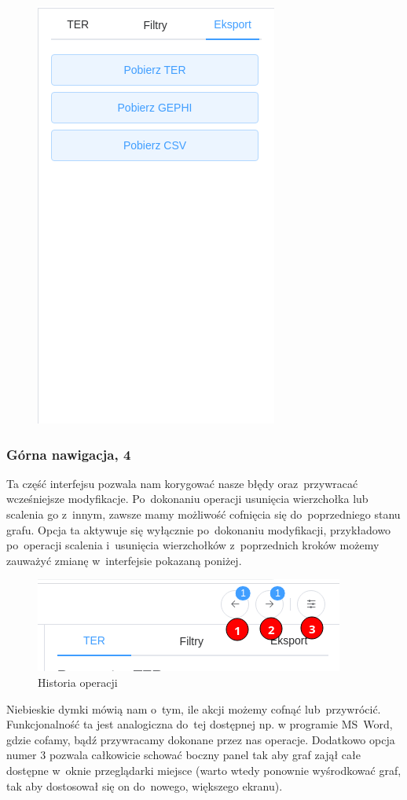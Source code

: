 \documentclass[12pt, a4paper]{article}
\begin{document}
\begin{figure}[H]
  \centering
  \includegraphics[width=0.4\linewidth, trim={0 8cm 0 0},clip]{images/graph-export.png}
\end{figure}

\subsubsection{Górna nawigacja, 4}

Ta część interfejsu pozwala nam korygować nasze błędy oraz~przywracać wcześniejsze modyfikacje. Po~dokonaniu operacji usunięcia wierzchołka lub scalenia go z~innym, zawsze mamy możliwość cofnięcia się do~poprzedniego stanu grafu. Opcja ta aktywuje się wyłącznie po~dokonaniu modyfikacji, przykładowo po~operacji scalenia i~usunięcia wierzchołków z~poprzednich kroków możemy zauważyć zmianę w~interfejsie pokazaną poniżej.

\begin{figure}[H]
  \centering
  \includegraphics[width=0.6\linewidth]{images/graph-top-navigation.png}
  \caption{Historia operacji}
\end{figure}

\noindent Niebieskie dymki mówią nam o~tym, ile akcji możemy cofnąć lub~przywrócić. Funkcjonalność ta jest analogiczna do~tej dostępnej np. w programie MS~Word, gdzie cofamy, bądź przywracamy dokonane przez nas operacje. Dodatkowo opcja numer $3$ pozwala całkowicie schować boczny panel tak aby graf zajął całe dostępne w~oknie przeglądarki miejsce (warto wtedy ponownie wyśrodkować graf, tak aby dostosował się on do~nowego, większego ekranu).
\end{document}
